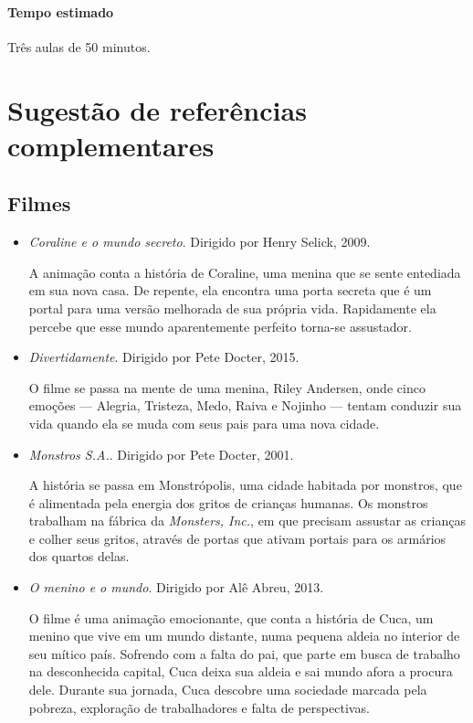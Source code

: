 \documentclass[11pt]{extarticle}
\begin{document}
\paragraph{Tempo estimado} Três aulas de 50 minutos.

\section{Sugestão de referências complementares}

\subsection{Filmes}

\begin{itemize}

\item \textit{Coraline e o mundo secreto}. Dirigido por Henry Selick, 2009.

A animação conta a história de Coraline, uma menina que se sente entediada em sua nova casa. De repente, ela encontra uma porta secreta que é um portal para uma versão melhorada de sua própria vida. Rapidamente ela percebe que esse mundo aparentemente perfeito torna-se assustador.

\item \textit{Divertidamente}. Dirigido por Pete Docter, 2015.

O filme se passa na mente de uma menina, Riley Andersen, onde cinco emoções — Alegria, Tristeza, Medo, Raiva e Nojinho — tentam conduzir sua vida quando ela se muda com seus pais para uma nova cidade. 

\item \textit{Monstros S.A.}. Dirigido por Pete Docter, 2001.

A história se passa em Monstrópolis, uma cidade habitada por monstros, que é alimentada pela energia dos gritos de crianças humanas. Os monstros trabalham na fábrica da \textit{Monsters, Inc.}, em que precisam assustar as crianças e colher seus gritos, através de portas que ativam portais para os armários dos quartos delas. 

\item \textit{O menino e o mundo}. Dirigido por Alê Abreu, 2013.

O filme é uma animação emocionante, que conta a história de Cuca, um menino que vive em um mundo distante, numa pequena aldeia no interior de seu mítico país. Sofrendo com a falta do pai, que parte em busca de trabalho na desconhecida capital, Cuca deixa sua aldeia e sai mundo afora a procura dele. Durante sua jornada, Cuca descobre uma sociedade marcada pela pobreza, exploração de trabalhadores e falta de perspectivas.

\end{itemize}
\end{document}
